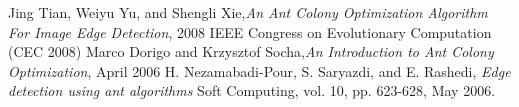 \documentclass[paper=a4, fontsize=11pt]{scrartcl}
\numberwithin{equation}{section}		%
\numberwithin{figure}{section}			%
\numberwithin{table}{section}				%
\begin{document}
\begin{thebibliography}{99}

 Jing Tian, Weiyu Yu, and Shengli Xie,{\textit{An Ant Colony Optimization Algorithm For Image Edge Detection}}, 2008 IEEE Congress on Evolutionary Computation (CEC 2008) 
 Marco Dorigo and Krzysztof Socha,{\textit{An Introduction to
Ant Colony Optimization}}, April 2006
 H. Nezamabadi-Pour, S. Saryazdi, and E. Rashedi, {\textit{Edge detection using ant algorithms}} Soft Computing, vol. 10, pp. 623-628, May 2006.
\end{thebibliography}


\end{document}
